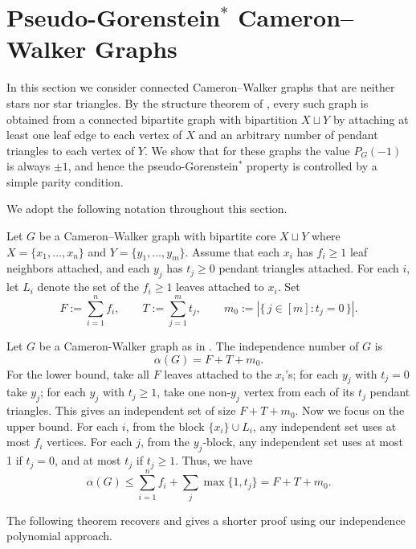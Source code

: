 \documentclass[12pt]{amsart}
\theoremstyle{plain}
\theoremstyle{definition}
\begin{document}
\section{Pseudo-Gorenstein$^{*}$ Cameron--Walker Graphs}

In this section we consider connected Cameron--Walker graphs that are neither stars nor star triangles. By the structure theorem of \cite{CW+Graphs}, every such graph is obtained from a connected bipartite graph with bipartition \(X\sqcup Y\) by attaching at least one leaf edge to each vertex of \(X\) and an arbitrary number of pendant triangles to each vertex of \(Y\). We show that for these graphs the value \(P_G(-1)\) is always \(\pm1\), and hence the pseudo-Gorenstein\(^{*}\) property is controlled by a simple parity condition.



We adopt the following notation throughout this section. 

\begin{notation}\label{not:CW}
Let $G$ be a Cameron--Walker graph with bipartite core $X\sqcup Y$ where
$X=\{x_1,\dots,x_n\}$ and $Y=\{y_1,\dots,y_m\}$.
Assume that each $x_i$ has $f_i\ge 1$ leaf neighbors attached, and each $y_j$ has $t_j\ge 0$
pendant triangles attached. For each \(i\), let \(L_i\) denote the set of the \(f_i\ge 1\) leaves attached to \(x_i\). 
Set
\[
F:=\sum_{i=1}^n f_i,
\qquad
T:=\sum_{j=1}^m t_j,
\qquad
m_0:=|\{\,j\in[m]:t_j=0\,\}|.
\]
\end{notation}


\begin{remark}\label{rem:CW_indep_number}
Let $G$ be a Cameron-Walker graph as in . The independence number of $G$ is
 \[
 \alpha(G)=F+T+m_0.
 \]
 For the lower bound, take all $F$ leaves attached to the $x_i$'s; for each $y_j$ with $t_j=0$ take $y_j$; for each $y_j$ with $t_j\ge 1$, take one non-$y_j$ vertex from each of its $t_j$ pendant triangles. This gives an independent set of size $F+T+m_0$.
 Now we focus on the upper bound. For each $i$, from the block $\{x_i\}\cup L_i$, any independent set uses at most $f_i$ vertices. For each $j$, from the $y_j$-block, any independent set uses at most 1 if $t_j=0$, and at most $t_j$ if $t_j\geq 1$. Thus, we have
 \[
 \alpha (G) \leq \sum_{i=1}^n f_i +\sum_{j} \max\{1,t_j\} = F+T+m_0.
 \]
\end{remark}




The following theorem recovers \cite[Theorem 1.1]{hibi2021CW} and gives a shorter proof using our independence polynomial approach.
\end{document}
